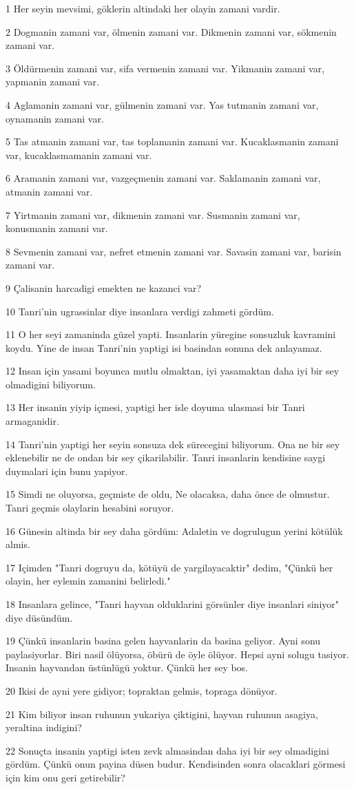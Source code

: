 \par 1 Her seyin mevsimi, göklerin altindaki her olayin zamani vardir.
\par 2 Dogmanin zamani var, ölmenin zamani var. Dikmenin zamani var, sökmenin zamani var.
\par 3 Öldürmenin zamani var, sifa vermenin zamani var. Yikmanin zamani var, yapmanin zamani var.
\par 4 Aglamanin zamani var, gülmenin zamani var. Yas tutmanin zamani var, oynamanin zamani var.
\par 5 Tas atmanin zamani var, tas toplamanin zamani var. Kucaklasmanin zamani var, kucaklasmamanin zamani var.
\par 6 Aramanin zamani var, vazgeçmenin zamani var. Saklamanin zamani var, atmanin zamani var.
\par 7 Yirtmanin zamani var, dikmenin zamani var. Susmanin zamani var, konusmanin zamani var.
\par 8 Sevmenin zamani var, nefret etmenin zamani var. Savasin zamani var, barisin zamani var.
\par 9 Çalisanin harcadigi emekten ne kazanci var?
\par 10 Tanri'nin ugrassinlar diye insanlara verdigi zahmeti gördüm.
\par 11 O her seyi zamaninda güzel yapti. Insanlarin yüregine sonsuzluk kavramini koydu. Yine de insan Tanri'nin yaptigi isi basindan sonuna dek anlayamaz.
\par 12 Insan için yasami boyunca mutlu olmaktan, iyi yasamaktan daha iyi bir sey olmadigini biliyorum.
\par 13 Her insanin yiyip içmesi, yaptigi her isle doyuma ulasmasi bir Tanri armaganidir.
\par 14 Tanri'nin yaptigi her seyin sonsuza dek sürecegini biliyorum. Ona ne bir sey eklenebilir ne de ondan bir sey çikarilabilir. Tanri insanlarin kendisine saygi duymalari için bunu yapiyor.
\par 15 Simdi ne oluyorsa, geçmiste de oldu, Ne olacaksa, daha önce de olmustur. Tanri geçmis olaylarin hesabini soruyor.
\par 16 Günesin altinda bir sey daha gördüm: Adaletin ve dogrulugun yerini kötülük almis.
\par 17 Içimden "Tanri dogruyu da, kötüyü de yargilayacaktir" dedim, "Çünkü her olayin, her eylemin zamanini belirledi."
\par 18 Insanlara gelince, "Tanri hayvan olduklarini görsünler diye insanlari siniyor" diye düsündüm.
\par 19 Çünkü insanlarin basina gelen hayvanlarin da basina geliyor. Ayni sonu paylasiyorlar. Biri nasil ölüyorsa, öbürü de öyle ölüyor. Hepsi ayni solugu tasiyor. Insanin hayvandan üstünlügü yoktur. Çünkü her sey bos.
\par 20 Ikisi de ayni yere gidiyor; topraktan gelmis, topraga dönüyor.
\par 21 Kim biliyor insan ruhunun yukariya çiktigini, hayvan ruhunun asagiya, yeraltina indigini?
\par 22 Sonuçta insanin yaptigi isten zevk almasindan daha iyi bir sey olmadigini gördüm. Çünkü onun payina düsen budur. Kendisinden sonra olacaklari görmesi için kim onu geri getirebilir?

